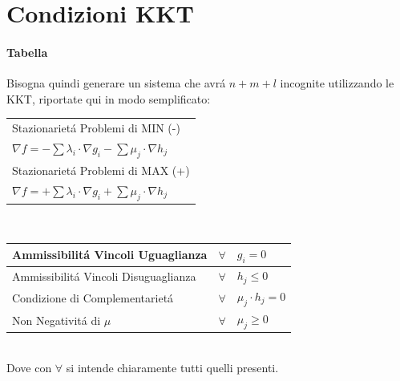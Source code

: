 \documentclass[12pt, a4paper, openany]{book}
\begin{document}
\section{Condizioni KKT}
\paragraph{Tabella}
Bisogna quindi generare un sistema che avrá $n+m+l$ incognite utilizzando le KKT,
riportate qui in modo semplificato:\\
\begin{tabularx}{\textwidth}{|Y|}
	\hline
	Stazionarietá Problemi di MIN (-)                                             \\
	$ \nabla f = - \sum \lambda_i \cdot \nabla g_i - \sum \mu_j \cdot \nabla h_j$ \\
	\hline \hline
	Stazionarietá Problemi di MAX (+)                                             \\
	$ \nabla f = + \sum \lambda_i \cdot \nabla g_i + \sum \mu_j \cdot \nabla h_j$ \\
	\hline
\end{tabularx}\\
\begin{tabularx}{\textwidth}{|l|cY|}
	\hline
	Ammissibilitá Vincoli Uguaglianza    & $\forall$  & $ g_i = 0$             \\
	\hline
	Ammissibilitá Vincoli Disuguaglianza & $ \forall$ & $ h_j\leq 0$           \\
	\hline
	Condizione di Complementarietá       & $\forall$  & $ \mu_j \cdot h_j = 0$ \\
	\hline
	Non Negativitá di $\mu$              & $\forall $ & $ \mu_j \geq 0$        \\
	\hline
\end{tabularx}
\\Dove con $\forall$ si intende chiaramente tutti quelli presenti.
\end{document}
